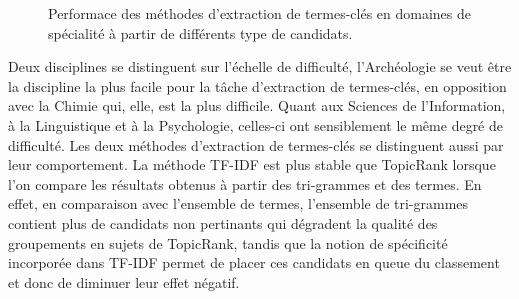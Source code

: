 \begin{figure}
{
      }
      \caption{Performace des méthodes d'extraction de termes-clés en domaines
               de spécialité à partir de différents type de candidats.
               \label{fig:resultats}}
    \end{figure}

    Deux disciplines se distinguent sur l'échelle de difficulté, l'Archéologie
    se veut être la discipline la plus facile pour la tâche d'extraction de
    termes-clés, en opposition avec la Chimie qui, elle, est la plus difficile.
    Quant aux Sciences de l'Information, à la Linguistique et à la Psychologie,
    celles-ci ont sensiblement le même degré de difficulté. Les deux méthodes
    d'extraction de termes-clés se distinguent aussi par leur comportement. La
    méthode TF-IDF est plus stable que TopicRank lorsque l'on compare les
    résultats obtenus à partir des tri-grammes et des termes. En effet, en
    comparaison avec l'ensemble de termes, l'ensemble de tri-grammes contient
    plus de candidats non pertinants qui dégradent la qualité des groupements en
    sujets de TopicRank, tandis que la notion de spécificité incorporée dans
    TF-IDF permet de placer ces candidats en queue du classement et donc de
    diminuer leur effet négatif.

